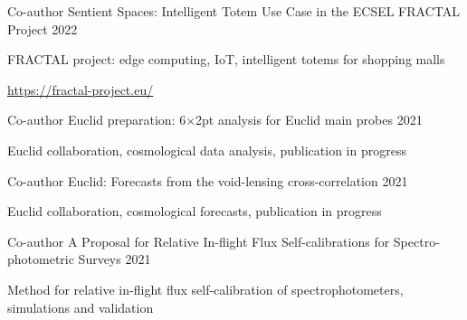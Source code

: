 


\begin{cventries}


\cventry
{Co-author} %
{Sentient Spaces: Intelligent Totem Use Case in the ECSEL FRACTAL Project} %
{2022} %
{ %
\begin{cvitems}
  \item {FRACTAL project: edge computing, IoT, intelligent totems for shopping malls}
  \item {\url{https://fractal-project.eu/}}
\end{cvitems}
}


\cventry
{Co-author} %
{Euclid preparation: 6×2pt analysis for Euclid main probes} %
{2021} %
{ %
\begin{cvitems}
  \item {Euclid collaboration, cosmological data analysis, publication in progress}
\end{cvitems}
}


\cventry
{Co-author} %
{Euclid: Forecasts from the void-lensing cross-correlation} %
{2021} %
{ %
\begin{cvitems}
  \item {Euclid collaboration, cosmological forecasts, publication in progress}
\end{cvitems}
}


\cventry
{Co-author} %
{A Proposal for Relative In-flight Flux Self-calibrations for Spectro-photometric Surveys} %
{2021} %
{ %
\begin{cvitems}
  \item {Method for relative in-flight flux self-calibration of spectrophotometers, simulations and validation}
\end{cvitems}
}


\end{cventries}
